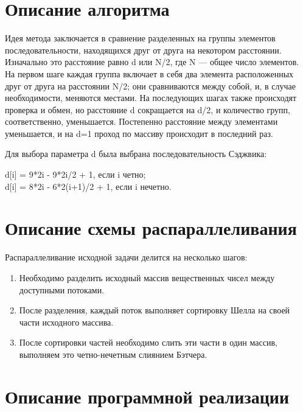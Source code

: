 \documentclass{report}
\begin{document}
\section*{Описание алгоритма}
\par Идея метода заключается в сравнение разделенных на группы элементов последовательности, находящихся друг от друга на некотором расстоянии. Изначально это расстояние равно d или N/2, где N — общее число элементов. На первом шаге каждая группа включает в себя два элемента расположенных друг от друга на расстоянии N/2; они сравниваются между собой, и, в случае необходимости, меняются местами. На последующих шагах также происходят проверка и обмен, но расстояние d сокращается на d/2, и количество групп, соответственно, уменьшается. Постепенно расстояние между элементами уменьшается, и на d=1 проход по массиву происходит в последний раз.

\par Для выбора параметра d была выбрана последовательность Сэджвика:
\begin{center}
d[i] = 9*2i - 9*2i/2 + 1, если i четно; \\
d[i] = 8*2i - 6*2(i+1)/2 + 1, если i нечетно.
\end{center}

\newpage

\section*{Описание схемы распараллеливания}
Распараллеливание исходной задачи делится на несколько шагов:
\begin{enumerate}
\item Необходимо разделить исходный массив вещественных чисел между доступными потоками. 
\item После разделения, каждый поток выполняет сортировку Шелла на своей части исходного массива.
\item После сортировки частей необходимо слить эти части в один массив, выполняем это четно-нечетным слиянием Бэтчера.
\end{enumerate}
\newpage

\section*{Описание программной реализации}
\end{document}

